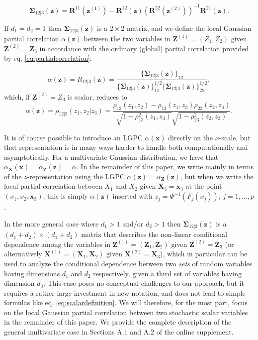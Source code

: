 \documentclass[
  12pt,
  letterpaper]{article}
\newcommand{\X}{\bm{X}}
\newcommand{\Xone}{\bm{X}^{(1)}}
\newcommand{\Xtwo}{\bm{X}^{(2)}}
\newcommand{\x}{\bm{x}}
\newcommand{\Z}{\bm{Z}}
\newcommand{\z}{\bm{z}}
\newcommand{\Zone}{\bm{Z}^{(1)}}
\newcommand{\Ztwo}{\bm{Z}^{(2)}}
\newcommand{\zone}{\bm{z}^{(1)}}
\newcommand{\ztwo}{\bm{z}^{(2)}}
\newcommand{\R}{\bm{R}}
\newcommand{\fSigma}{\bm{\Sigma}}
\theoremstyle{definition}
\theoremstyle{definition}
\theoremstyle{definition}
\theoremstyle{remark}
\begin{document}
\begin{equation}
\fSigma_{12|3}(\z) = \R^{11}(\zone) - \R^{12}(\z)\left(\R^{22}(\ztwo)\right)^{-1}\R^{21}(\z).
\label{eq:matrixlocalpartial}
\end{equation}

If \(d_1=d_2=1\) then \(\fSigma_{12|3}(\z)\) is a \(2\times 2\) matrix, and we define the local Gaussian partial correlation \(\alpha(\z)\) between the two variables in \(\Zone = (Z_1,Z_2)\) given \(\Ztwo = \Z_3\) in accordance with the ordinary (global) partial correlation provided by eq. \eqref{eq:partialcorrelation}:

\begin{equation}
\alpha(\z) = R_{12|3}(\z) = \frac{\Big\{\fSigma_{12|3}(\z)\Big\}_{12}}{\Big\{\fSigma_{12|3}(\z)\Big\}^{1/2}_{11}\Big\{\fSigma_{12|3}(\z)\Big\}^{1/2}_{22}},
\label{eq:definition}
\end{equation}
which, if \(\Ztwo = Z_3\) is scalar, reduces to
\begin{equation}
\alpha(\z) = \rho_{12|3}(z_1, z_2|z_3) = \frac{\rho_{12}(z_1, z_2) - \rho_{13}(z_1,z_3)\rho_{23}(z_2,z_3)}{\sqrt{1 - \rho^2_{13}(z_1,z_3)}\sqrt{1 - \rho^2_{23}(z_2, z_3)}}.
\label{eq:scalardefinition}
\end{equation}

It is of course possible to introduce an LGPC \(\alpha(\x)\) directly on the \(x\)-scale, but that representation is in many ways harder to handle both computationally and asymptotically. For a multivariate Gaussian distribution, we have that \(\alpha_{\X}(\x) = \alpha_{\Z}(\z) = \alpha\). In the remainder of this paper, we write mainly in terms of the \(z\)-representation using the LGPC \(\alpha(\z) = \alpha_{\Z}(\z)\), but when we write the local partial correlation between \(X_1\) and \(X_2\) given \(\X_3 = \x_3\) at the point \((x_1,x_2,\x_3)\), this is simply \(\alpha(\z)\) inserted with \(z_j = \Phi^{-1}(F_{j}(x_j))\), \(j=1,\ldots,p\).

In the more general case where \(d_1 > 1\) and/or \(d_2 > 1\) then \(\fSigma_{12|3}(\z)\) is a \((d_1+d_2)\times (d_1+d_2)\) matrix that describes the non-linear conditional dependence among the variables in \(\Zone = (\Z_1, \Z_2)\) given \(\Ztwo = \Z_3\) (or alternatively \(\Xone = (\X_1, \X_2)\) given \(\Xtwo = \X_3\)), which in particular can be used to analyze the conditional dependence between two \emph{sets} of random variables having dimensions \(d_1\) and \(d_2\) respectively, given a third set of variables having dimension \(d_3\). This case poses no conceptual challenges to our approach, but it requires a rather large investment in new notation, and does not lead to simple formulas like eq. \eqref{eq:scalardefinition}. We will therefore, for the most part, focus on the local Gaussian partial correlation between two stochastic scalar variables in the remainder of this paper. We provide the complete description of the general multivariate case in Sections A.1 and A.2 of the online supplement.
\end{document}
